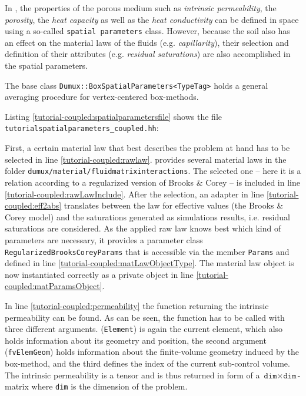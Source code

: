 In \Dumux, the properties of the porous medium such as \textit{intrinsic 
permeability}, the \textit{porosity}, the \textit{heat capacity} as
well as the \textit{heat conductivity} can be defined in space using a
so-called \texttt{spatial parameters} class.  However, because the soil
also has an effect on the material laws of the fluids (e.g. \textit{capillarity}),
their selection and definition of their attributes (e.g. \textit{residual 
saturations}) are also accomplished in the spatial parameters.

The base class \texttt{Dumux::BoxSpatialParameters<TypeTag>} holds a general 
averaging procedure for vertex-centered box-methods.

Listing \ref{tutorial-coupled:spatialparametersfile} shows the file
\verb+tutorialspatialparameters_coupled.hh+:

\begin{lst}\label{tutorial-coupled:spatialparametersfile} \mbox{}

\end{lst}

First, a certain material law that best describes the problem at hand has to
be selected in line \ref{tutorial-coupled:rawlaw}\label{tutorial-coupled:materialLaw}. 
\Dumux provides several material laws in the folder 
\verb+dumux/material/fluidmatrixinteractions+.
The selected one -- here it is a relation according to a regularized version of Brooks \& Corey --  is included
in line \ref{tutorial-coupled:rawLawInclude}. After the selection,
an adapter in line \ref{tutorial-coupled:eff2abs} translates between the law
for effective values (the Brooks \& Corey model) and the saturations generated as simulations results, i.e. residual saturations are considered. 
As the applied raw law knows best which kind of parameters are necessary,
it provides a parameter class \texttt{RegularizedBrooksCoreyParams} that is
accessible via the member \texttt{Params} and defined in line 
\ref{tutorial-coupled:matLawObjectType}. The material law object 
is now instantiated correctly as a private object
in line \ref{tutorial-coupled:matParamsObject}.

In line \ref{tutorial-coupled:permeability} the function returning the
intrinsic permeability can be found. As can be seen, the function has
to be called with three different arguments. 
(\texttt{Element}) is again the current element, which also holds information
about its geometry and position, the second argument
(\texttt{fvElemGeom}) holds information about the finite-volume geometry induced
by the box-method, and the third defines the index of the current sub-control 
volume. The intrinsic permeability is a tensor and is thus returned in form of
a $\texttt{dim} \times \texttt{dim}$-matrix where \texttt{dim} is the dimension 
of the problem. 

